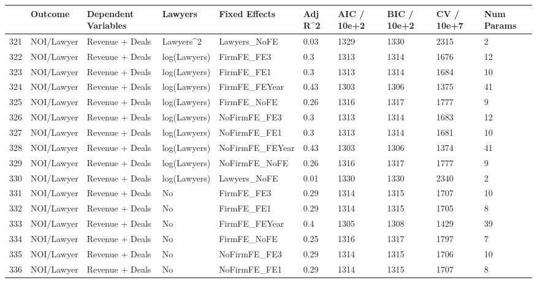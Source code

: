 \begin{table}[ht]
\centering
\begin{tabular}{rlllllllll}
  \hline
 & Outcome & Dependent Variables & Lawyers & Fixed Effects & Adj R^2 & AIC / 10e+2 & BIC / 10e+2 & CV / 10e+7 & Num Params \\ 
  \hline
321 & NOI/Lawyer & Revenue + Deals & Lawyers^2 & Lawyers\_NoFE & 0.03 & 1329 & 1330 & 2315 & 2 \\ 
  322 & NOI/Lawyer & Revenue + Deals & log(Lawyers) & FirmFE\_FE3 & 0.3 & 1313 & 1314 & 1676 & 12 \\ 
  323 & NOI/Lawyer & Revenue + Deals & log(Lawyers) & FirmFE\_FE1 & 0.3 & 1313 & 1314 & 1684 & 10 \\ 
  324 & NOI/Lawyer & Revenue + Deals & log(Lawyers) & FirmFE\_FEYear & 0.43 & 1303 & 1306 & 1375 & 41 \\ 
  325 & NOI/Lawyer & Revenue + Deals & log(Lawyers) & FirmFE\_NoFE & 0.26 & 1316 & 1317 & 1777 & 9 \\ 
  326 & NOI/Lawyer & Revenue + Deals & log(Lawyers) & NoFirmFE\_FE3 & 0.3 & 1313 & 1314 & 1683 & 12 \\ 
  327 & NOI/Lawyer & Revenue + Deals & log(Lawyers) & NoFirmFE\_FE1 & 0.3 & 1313 & 1314 & 1681 & 10 \\ 
  328 & NOI/Lawyer & Revenue + Deals & log(Lawyers) & NoFirmFE\_FEYear & 0.43 & 1303 & 1306 & 1374 & 41 \\ 
  329 & NOI/Lawyer & Revenue + Deals & log(Lawyers) & NoFirmFE\_NoFE & 0.26 & 1316 & 1317 & 1777 & 9 \\ 
  330 & NOI/Lawyer & Revenue + Deals & log(Lawyers) & Lawyers\_NoFE & 0.01 & 1330 & 1330 & 2340 & 2 \\ 
  331 & NOI/Lawyer & Revenue + Deals & No & FirmFE\_FE3 & 0.29 & 1314 & 1315 & 1707 & 10 \\ 
  332 & NOI/Lawyer & Revenue + Deals & No & FirmFE\_FE1 & 0.29 & 1314 & 1315 & 1705 & 8 \\ 
  333 & NOI/Lawyer & Revenue + Deals & No & FirmFE\_FEYear & 0.4 & 1305 & 1308 & 1429 & 39 \\ 
  334 & NOI/Lawyer & Revenue + Deals & No & FirmFE\_NoFE & 0.25 & 1316 & 1317 & 1797 & 7 \\ 
  335 & NOI/Lawyer & Revenue + Deals & No & NoFirmFE\_FE3 & 0.29 & 1314 & 1315 & 1706 & 10 \\ 
  336 & NOI/Lawyer & Revenue + Deals & No & NoFirmFE\_FE1 & 0.29 & 1314 & 1315 & 1707 & 8 \\ 

\end{tabular}
\end{table}
